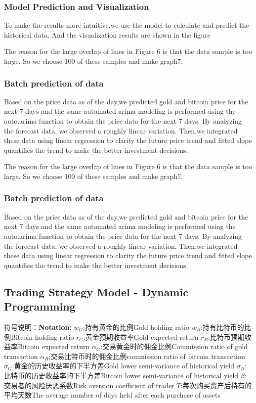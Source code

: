 \documentclass{mcmthesis}
\begin{document}
\subsubsection{Model Prediction and Visualization}
To make the results more intuitive,we use the model to calculate and predict the historical data. 
And the visualization results are shown in the figure


The reason for the large overlap of lines in Figure 6 is that the data sample is too large.
So we choose 100 of these samples and make graph7.

\subsubsection{Batch prediction of data}   %
Based on the price data as of the day,we predicted gold and bitcoin price for the next 7 days 
and the same automated arima modeling is performed using the auto.arima function to obtain the price data for the next 7 days.
By analyzing the forecast data, we observed a roughly linear variation. 
Then,we integrated these data using linear regression to clarity the future price trend 
and fitted slope quantifies the trend to make the better investment decisions.



The reason for the large overlap of lines in Figure 6 is that the data sample is too large.
So we choose 100 of these samples and make graph7.

\subsubsection{Batch prediction of data}   %
Based on the price data as of the day,we predicted gold and bitcoin price for the next 7 days 
and the same automated arima modeling is performed using the auto.arima function to obtain the price data for the next 7 days.
By analyzing the forecast data, we observed a roughly linear variation. 
Then,we integrated these data using linear regression to clarity the future price trend 
and fitted slope quantifies the trend to make the better investment decisions.



\subsection{Trading Strategy Model - Dynamic Programming }
符号说明：\textbf{Notation:}
$w_G$:持有黄金的比例Gold holding ratio
$w_B$:持有比特币的比例Bitcoin holding ratio
$r_G$:黄金预期收益率Gold expected return
$r_B$:比特币预期收益率Bitcoin expected return
$\alpha _G$:交易黄金时的佣金比例Commission ratio of gold transaction
$\alpha _B$:交易比特币时的佣金比例commission ratio of bitcoin transaction
$\sigma _G$:黄金的历史收益率的下半方差Gold lower semi-variance of historical yield
$\sigma _B$:比特币的历史收益率的下半方差Bitcoin lower semi-variance of historical yield
$\beta $:交易者的风险厌恶系数Risk aversion coefficient of trader
$T$:每次购买资产后持有的平均天数The average number of days held after each purchase of assets
\end{document}
